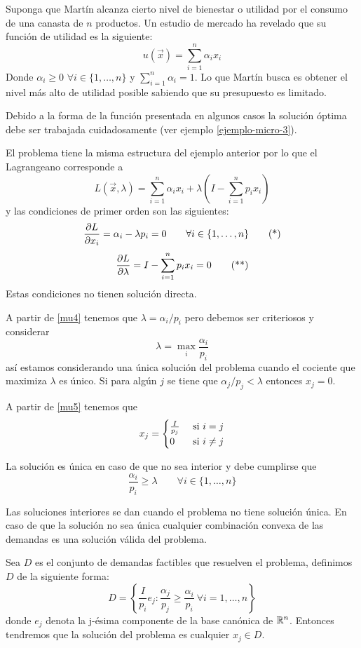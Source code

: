 \begin{ejemplo}\label{ejemplo-micro-5}
Suponga que Mart\'in alcanza cierto nivel de bienestar o utilidad por el consumo de una canasta de $n$ productos. Un estudio de mercado ha revelado que su funci\'on de utilidad es la siguiente:
$$u(\vec{x}) = \sum_{i=1}^n \alpha_i x_i$$
Donde $\alpha_i \geq 0$ $\forall i\in\{1,\ldots , n\}$ y $\sum_{i=1}^n \alpha_i = 1$. Lo que Mart\'in busca es obtener el nivel m\'as alto de utilidad posible sabiendo que su presupuesto es limitado. 

Debido a la forma de la funci\'on presentada en algunos casos la soluci\'on \'optima debe ser trabajada cuidadosamente (ver ejemplo \ref{ejemplo-micro-3}).

El problema tiene la misma estructura del ejemplo anterior por lo que el Lagrangeano corresponde a
$$L(\vec{x},\lambda) = \sum_{i=1}^n \alpha_i x_i + \lambda \left(I-\sum_{i=1}^n p_i x_i \right)$$
y las condiciones de primer orden son las siguientes:
	\begin{gather}
	\label{mu4} \frac{\partial L}{\partial x_i} = \alpha_i - \lambda p_i = 0 \qquad \forall i \in \{1,\ldots , n\} \tag{*}
	\end{gather}
	\begin{gather}
	\label{mu5} \frac{\partial L}{\partial \lambda} = I - \sum_{i=1}^n p_i x_i = 0 \tag{**}
	\end{gather}
Estas condiciones no tienen soluci\'on directa. 

A partir de \eqref{mu4} tenemos que $\lambda = \alpha_i / p_i$ pero debemos ser criteriosos y considerar
$$\lambda = \max_i \frac{\alpha_i}{p_i}$$	
as\'i estamos considerando una \'unica soluci\'on del problema cuando el cociente que maximiza $\lambda$ es \'unico. Si para alg\'un $j$ se tiene que $\alpha_j / p_j < \lambda$ entonces $x_j = 0$.

A partir de \eqref{mu5} tenemos que
$$x_j  = \begin{cases}
\frac{I}{p_j} & \text{ si } i=j \cr
0			  & \text{ si } i\neq j
\end{cases}$$

La soluci\'on es \'unica en caso de que no sea interior y debe cumplirse que
$$\frac{\alpha_i}{p_i} \geq \lambda \qquad \forall i \in \{1,\ldots , n\}$$

Las soluciones interiores se dan cuando el problema no tiene soluci\'on \'unica. En caso de que la soluci\'on no sea \'unica cualquier combinaci\'on convexa de las demandas es una soluci\'on v\'alida del problema. 

Sea $D$ es el conjunto de demandas factibles que resuelven el problema, definimos $D$ de la siguiente forma:
$$D = \left\{\frac{I}{p_i} e_j : \frac{\alpha_j}{p_j} \geq \frac{\alpha_i}{p_i} \: \forall i=1,\ldots , n \right\}$$
donde $e_j$ denota la j-\'esima componente de la base can\'onica de $\mathbb{R}^n$. Entonces tendremos que la soluci\'on del problema es cualquier $x_j \in D$.


\end{ejemplo}
